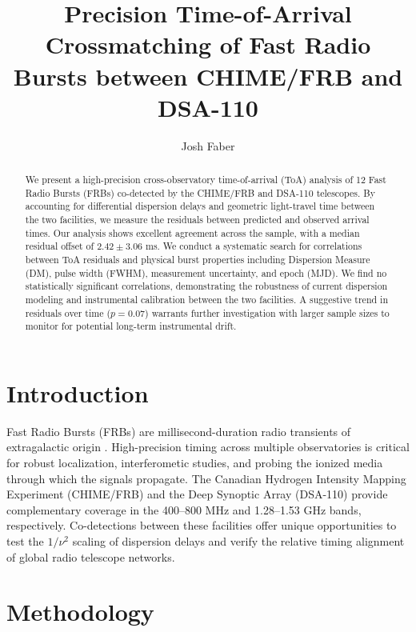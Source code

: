 \documentclass[twocolumn]{aastex631}
\begin{document}
\title{Precision Time-of-Arrival Crossmatching of Fast Radio Bursts between CHIME/FRB and DSA-110}

\author[0000-0000-0000-0000]{Josh Faber}

\begin{abstract}
We present a high-precision cross-observatory time-of-arrival (ToA) analysis of 12 Fast Radio Bursts (FRBs) co-detected by the CHIME/FRB and DSA-110 telescopes. By accounting for differential dispersion delays and geometric light-travel time between the two facilities, we measure the residuals between predicted and observed arrival times. Our analysis shows excellent agreement across the sample, with a median residual offset of $2.42 \pm 3.06$ ms. We conduct a systematic search for correlations between ToA residuals and physical burst properties including Dispersion Measure (DM), pulse width (FWHM), measurement uncertainty, and epoch (MJD). We find no statistically significant correlations, demonstrating the robustness of current dispersion modeling and instrumental calibration between the two facilities. A suggestive trend in residuals over time ($p=0.07$) warrants further investigation with larger sample sizes to monitor for potential long-term instrumental drift.
\end{abstract}


\section{Introduction} \label{sec:intro}

Fast Radio Bursts (FRBs) are millisecond-duration radio transients of extragalactic origin \citep{Lorimer2007, Thornton2013}. High-precision timing across multiple observatories is critical for robust localization, interferometic studies, and probing the ionized media through which the signals propagate. The Canadian Hydrogen Intensity Mapping Experiment (CHIME/FRB) and the Deep Synoptic Array (DSA-110) provide complementary coverage in the 400--800 MHz and 1.28--1.53 GHz bands, respectively. Co-detections between these facilities offer unique opportunities to test the $1/\nu^2$ scaling of dispersion delays and verify the relative timing alignment of global radio telescope networks.

\section{Methodology} \label{sec:methods}
\end{document}
